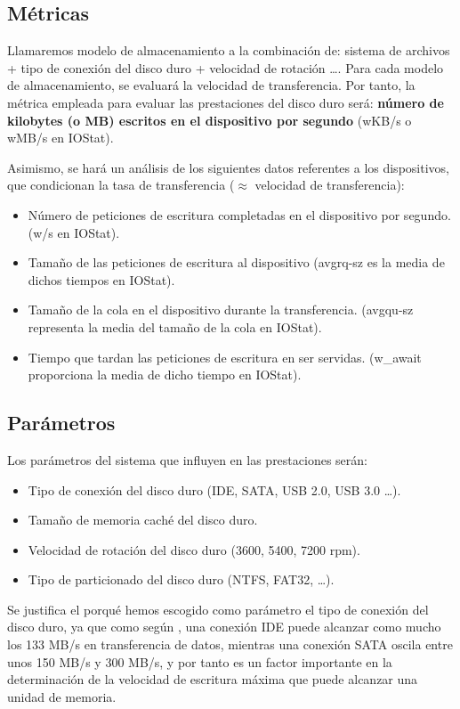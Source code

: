 \documentclass[a4paper,10pt]{article}
\renewcommand{\texttt}[2][black!60]{\textcolor{#1}{\ttfamily #2}}
\begin{document}
\subsection{Métricas}
Llamaremos modelo de almacenamiento a la combinación de: sistema de archivos + tipo de conexión del disco duro + velocidad de rotación \ldots.
Para cada modelo de almacenamiento, se evaluará la velocidad de transferencia. Por tanto, la métrica empleada para evaluar las prestaciones 
del disco duro será: \textbf{número de kilobytes (o MB) escritos en el dispositivo por segundo} (\texttt{wKB/s} o \texttt{wMB/s} en IOStat).
 
 Asimismo, se hará un análisis de los siguientes datos referentes a los dispositivos, que condicionan la tasa de transferencia
 ($\approx$ velocidad de transferencia):
\begin{itemize}
 \item Número de peticiones de escritura completadas en el dispositivo por segundo. (\texttt{w/s} en IOStat).
 \item Tamaño de las peticiones de escritura al dispositivo (\texttt{avgrq-sz} es la media de dichos tiempos en
 IOStat).
 \item Tamaño de la cola en el dispositivo durante la transferencia. (\texttt{avgqu-sz} representa la media del
 tamaño de la cola en IOStat).
 \item Tiempo que tardan las peticiones de escritura en ser servidas. (\texttt{w\_await} proporciona la media
 de dicho tiempo en IOStat).
\end{itemize}

\subsection{Parámetros}
Los parámetros del sistema que influyen en las prestaciones serán: \cite{hddparam}
\begin{itemize}
 \item Tipo de conexión del disco duro (IDE, SATA, USB 2.0, USB 3.0 \ldots).
 \item Tamaño de memoria caché del disco duro.
 \item Velocidad de rotación del disco duro (3600, 5400, 7200 rpm).
 \item Tipo de particionado del disco duro (NTFS, FAT32, \ldots).
\end{itemize}
Se justifica el porqué hemos escogido como parámetro el tipo de conexión del disco duro, ya que como
según \cite{ide}, una conexión IDE puede alcanzar como mucho los 133 MB/s en transferencia de datos,
mientras una conexión SATA oscila entre unos 150 MB/s y 300 MB/s, y por tanto es un factor importante en la determinación
de la velocidad de escritura máxima que puede alcanzar una unidad de memoria.
\end{document}
